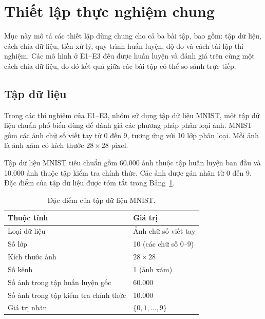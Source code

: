 \documentclass[a4paper,12pt]{article}
\begin{document}
\section{Thiết lập thực nghiệm chung}
\label{sec:setup}

Mục này mô tả các thiết lập dùng chung cho cả ba bài tập, bao gồm: tập dữ liệu, cách chia dữ liệu, tiền xử lý, quy trình huấn luyện, độ đo và cách tái lập thí nghiệm. Các mô hình ở E1--E3 đều được huấn luyện và đánh giá trên cùng một cách chia dữ liệu, do đó kết quả giữa các bài tập có thể so sánh trực tiếp.

\subsection{Tập dữ liệu}
\label{sec:dataset}

Trong các thí nghiệm của E1--E3, nhóm sử dụng tập dữ liệu MNIST, một tập dữ liệu chuẩn phổ biến dùng để đánh giá các phương pháp phân loại ảnh. MNIST gồm các ảnh chữ số viết tay từ 0 đến 9, tương ứng với 10 lớp phân loại. Mỗi ảnh là ảnh xám có kích thước $28 \times 28$ pixel.

Tập dữ liệu MNIST tiêu chuẩn gồm 60.000 ảnh thuộc tập huấn luyện ban đầu và 10.000 ảnh thuộc tập kiểm tra chính thức. Các ảnh được gán nhãn từ 0 đến 9. Đặc điểm của tập dữ liệu được tóm tắt trong Bảng~\ref{tab:dataset-info}.

\begin{table}[htbp]
    \centering
    \caption{Đặc điểm của tập dữ liệu MNIST.}
    \label{tab:dataset-info}
    \begin{tabular}{ll}
        \toprule
        Thuộc tính                           & Giá trị              \\
        \midrule
        Loại dữ liệu                         & Ảnh chữ số viết tay  \\
        Số lớp                               & 10 (các chữ số 0--9) \\
        Kích thước ảnh                       & $28 \times 28$       \\
        Số kênh                              & 1 (ảnh xám)          \\
        Số ảnh trong tập huấn luyện gốc      & 60.000               \\
        Số ảnh trong tập kiểm tra chính thức & 10.000               \\
        Giá trị nhãn                         & $\{0,1,\ldots,9\}$   \\
        \bottomrule
    \end{tabular}
\end{table}
\end{document}
